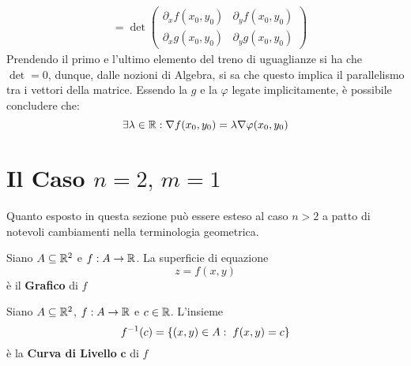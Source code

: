\begin{example}
\begin{solution}
\begin{align*}
			&=	\det \left(
				\begin{matrix}
					\partial_xf(x_0,y_0) & \partial_yf(x_0,y_0)\\
					\partial_xg(x_0,y_0) & \partial_yg(x_0,y_0)
				\end{matrix}
				\right)
		\end{align*}
		Prendendo il primo e l'ultimo elemento del treno di uguaglianze si ha che $\det = 0$, dunque, dalle nozioni di Algebra, si sa che questo implica il parallelismo tra i vettori della matrice. Essendo la $g$ e la $\varphi$ legate implicitamente, è possibile concludere che:
		\[\exists \lambda \in \mathbb{R}: \nabla f(x_0,y_0) = \lambda \nabla \varphi(x_0,y_0)\]
	\end{solution}
\end{example}

\newpage
{} %
\section{Il Caso \texorpdfstring{$n=2,\,m=1$}{n=2, m=1}}

Quanto esposto in questa sezione può essere esteso al caso $n > 2$ a patto di notevoli cambiamenti nella terminologia geometrica.
\begin{definition}[Grafico]
	Siano $A \subseteq \mathbb{R}^2$ e $f: A \to \mathbb{R}$. La superficie di equazione
	\[z = f(x,y)\]
	è il \textbf{Grafico} di $f$
\end{definition}
\begin{definition}
	\label{def:curv_liv}
	Siano $A \subseteq \mathbb{R}^2$, $f: A \to \mathbb{R}$ e $c \in \mathbb{R}$. L'insieme
	\[f^{-1}(c) = \left\{(x,y) \in A:\; f(x,y) = c\right\}\]
	è la \textbf{Curva di Livello} $\boldsymbol{c}$ di $f$
\end{definition}

